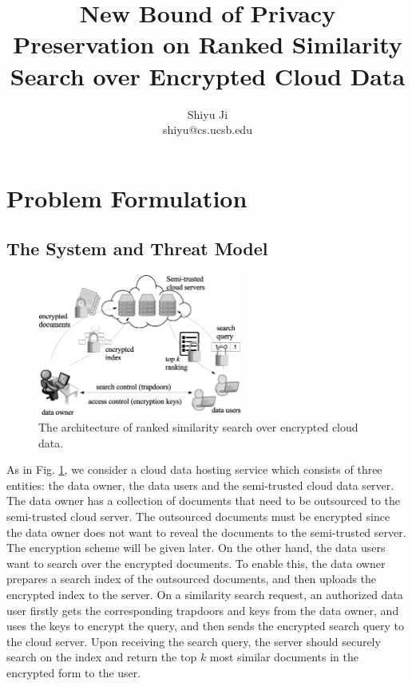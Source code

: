 \documentclass{article}
\begin{document}
\title{\Large\bf New Bound of Privacy Preservation on Ranked Similarity Search over Encrypted Cloud Data}
\author{Shiyu Ji\\ shiyu@cs.ucsb.edu}
\date{}
\maketitle

\newtheorem{definition}{Definition}
\theoremstyle{definition}
\newtheorem{theorem}{Theorem}
\theoremstyle{plain}
\newtheorem{lemma}{Lemma}
\theoremstyle{plain}
\newtheorem{corollary}{Corollary}
\theoremstyle{plain}

\section{Problem Formulation}
\subsection{The System and Threat Model}

\begin{figure}
\centering
\includegraphics[width=0.6\textwidth]{system_model.eps}
\caption{The architecture of ranked similarity search over encrypted cloud data.}
\label{fig:system_model}
\end{figure}

As in Fig. \ref{fig:system_model}, we consider a cloud data hosting service which consists of three entities: the data owner, the data users and the semi-trusted cloud data server. The data owner has a collection of documents that need to be outsourced to the semi-trusted cloud server. The outsourced documents must be encrypted since the data owner does not want to reveal the documents to the semi-trusted server. The encryption scheme will be given later. On the other hand, the data users want to search over the encrypted documents. To enable this, the data owner prepares a search index of the outsourced documents, and then uploads the encrypted index to the server. On a similarity search request, an authorized data user firstly gets the corresponding trapdoors and keys from the data owner, and uses the keys to encrypt the query, and then sends the encrypted search query to the cloud server. Upon receiving the search query, the server should securely search on the index and return the top $k$ most similar documents in the encrypted form to the user.
\end{document}
